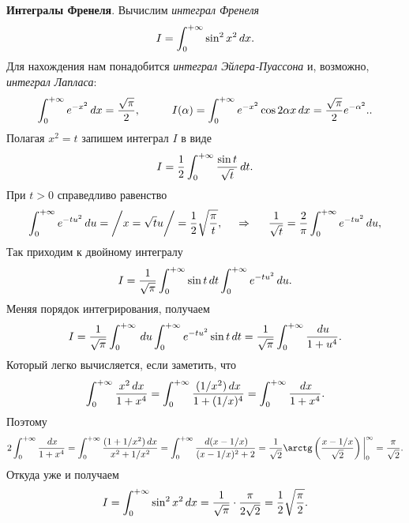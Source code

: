 \textbf{Интегралы Френеля}. Вычислим \textit{интеграл Френеля}
\begin{equation*}
    I = \int_0^{+\infty} \sin^2 x^2 \, d x.
\end{equation*}
Для нахождения нам понадобится \textit{интеграл Эйлера-Пуассона} и, возможно, \textit{интеграл Лапласа}:
\begin{equation*}
    \int_0^{+\infty} e^{-x^2} \d x = \frac{\sqrt{\pi}}{2},
    \hspace{10 mm}
    I(\alpha) = \int_0^{+\infty}  e^{-x^2} \cos 2 \alpha x \d x = \frac{\sqrt{\pi}}{2} e^{-\alpha^2}.
    .
\end{equation*}
Полагая $x^2 = t$ запишем интеграл $I$ в виде
\begin{equation*}
    I  = \frac{1}{2} \int_0^{+\infty}  \frac{\sin t}{\sqrt{ t}} \, d t.
\end{equation*}
При $t > 0$ справедливо равенство
\begin{equation}
    \int_0^{+\infty} e^{-t u^2} \, d u =
    \bigg/
        x = \sqrt{t} u
    \bigg/ = \frac{1}{2} \sqrt{\frac{\pi}{t}},
    \hspace{0.5cm} \Rightarrow \hspace{0.5cm}
    \frac{1}{\sqrt{t}} = \frac{2}{\pi} \int_0^{+\infty}  e^{-t u^2} \, d u,
\end{equation}
Так приходим к двойному интегралу
\begin{equation*}
    I = \frac{1}{\sqrt{\pi}} \int_0^{+\infty} \sin t \, d t \int_0^{+\infty}  e^{- t u^2} \, d u.
\end{equation*}
Меняя порядок интегрирования, получаем
\begin{equation*}
    I = \frac{1}{\sqrt{\pi}} \int_0^{+\infty} \, d u \int_0^{+\infty}  e^{-tu^2} \sin t \, d t = 
    \frac{1}{\sqrt{\pi}} \int_0^{+\infty} \frac{\, d u}{1 + u^4}.
\end{equation*}
Который легко вычисляется, если заметить, что
\begin{equation*}
    \int_0^{+\infty} \frac{x^2 \, d x }{1 + x^4} = \int_0^{+\infty} \frac{(1/x^2) \, d x}{1 + (1/x)^4} = \int_0^{+\infty} \frac{\, d x}{1 + x^4}.
\end{equation*}
Поэтому 
\begin{equation*}
    2 \int_0^{+\infty}  \frac{\d x}{1 + x^4} = \int_0^{+\infty}  \frac{(1 + 1/x^2)\d x}{x^2 + 1/x^2} = \int_0^{+\infty}  \frac{\d (x - 1/x)}{ (x-1/x)^2 + 2} = \frac{1}{\sqrt{2}} \arctg\left(
        \frac{x-1/x}{\sqrt{2}}
    \right) \bigg|_{0}^{\infty} = \frac{\pi}{\sqrt{2}}.
\end{equation*}
Откуда уже и получаем
\begin{equation}
    I = 
    \int_0^{+\infty} \sin^2 x^2 \, d x
    =
    \frac{1}{\sqrt{\pi}} \cdot \frac{\pi}{2 \sqrt{2}} = \frac{1}{2} \sqrt{\frac{\pi}{2}}.
\end{equation}

